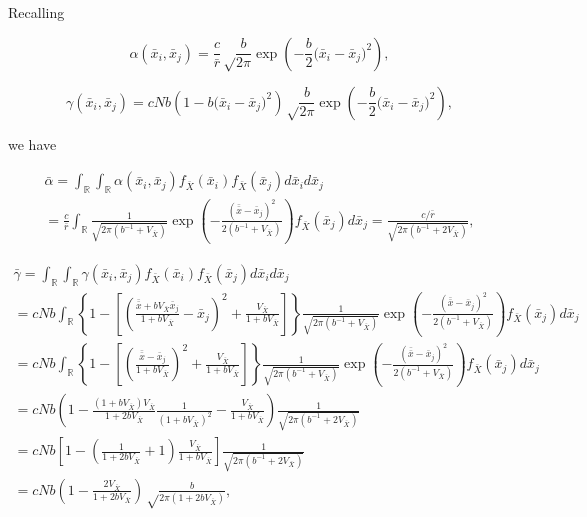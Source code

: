\documentclass[]{article}
\begin{document}
Recalling

\begin{equation}
\alpha(\bar x_i,\bar x_j)=\frac{c}{\bar r}\sqrt\frac{b}{2\pi}\exp\left(-\frac{b}{2}\big(\bar x_i-\bar x_j\big)^2\right),
\end{equation}

\begin{equation}
\gamma(\bar x_i,\bar x_j)=cNb\left(1-b\big(\bar x_i-\bar x_j\big)^2\right) \sqrt\frac{b}{2\pi}\exp\left(-\frac{b}{2}\big(\bar x_i-\bar x_j\big)^2\right),
\end{equation}

we have

\begin{multline}
\bar\alpha=
\int_\mathbb{R}\int_\mathbb{R}\alpha(\bar x_i,\bar x_j)f_{\bar X}(\bar x_i)f_{\bar X}(\bar x_j)d\bar x_id\bar x_j \\
=\frac{c}{\bar r}\int_\mathbb{R}\frac{1}{\sqrt{2\pi(b^{-1}+V_{\bar X})}}\exp\left(-\frac{(\bar{\bar x}-\bar x_j)^2}{2(b^{-1}+V_{\bar X})}\right)f_{\bar X}(\bar x_j)d\bar x_j
=\frac{c/\bar r}{\sqrt{2\pi(b^{-1}+2V_{\bar X})}},
\end{multline}

\begin{multline}
\bar\gamma=
\int_\mathbb{R}\int_\mathbb{R}\gamma(\bar x_i,\bar x_j)f_{\bar X}(\bar x_i)f_{\bar X}(\bar x_j)d\bar x_id\bar x_j \\
= cNb\int_\mathbb{R}\left\{1-\left[\left(\frac{\bar{\bar x}+bV_{\bar X}\bar x_j}{1+bV_{\bar X}}-\bar x_j\right)^2+\frac{V_{\bar X}}{1+bV_{\bar X}}\right]\right\}\frac{1}{\sqrt{2\pi(b^{-1}+V_{\bar X})}}\exp\left(-\frac{(\bar{\bar x}-\bar x_j)^2}{2(b^{-1}+V_{\bar X})}\right)f_{\bar X}(\bar x_j)d\bar x_j \\
= cNb\int_\mathbb{R}\left\{1-\left[\left(\frac{\bar{\bar x}-\bar x_j}{1+bV_{\bar X}}\right)^2+\frac{V_{\bar X}}{1+bV_{\bar X}}\right]\right\}\frac{1}{\sqrt{2\pi(b^{-1}+V_{\bar X})}}\exp\left(-\frac{(\bar{\bar x}-\bar x_j)^2}{2(b^{-1}+V_{\bar X})}\right)f_{\bar X}(\bar x_j)d\bar x_j \\
= cNb\left(1-\frac{(1+bV_{\bar X})V_{\bar X}}{1+2bV_{\bar X}}\frac{1}{(1+bV_{\bar X})^2}-\frac{V_{\bar X}}{1+bV_{\bar X}}\right)\frac{1}{\sqrt{2\pi(b^{-1}+2V_{\bar X})}} \\
= cNb\left[1-\left(\frac{1}{1+2bV_{\bar X}}+1\right)\frac{V_{\bar X}}{1+bV_{\bar X}}\right]\frac{1}{\sqrt{2\pi(b^{-1}+2V_{\bar X})}} \\
= cNb\left(1-\frac{2V_{\bar X}}{1+2bV_{\bar X}}\right)\sqrt\frac{b}{2\pi(1+2bV_{\bar X})},
\end{multline}
\end{document}
